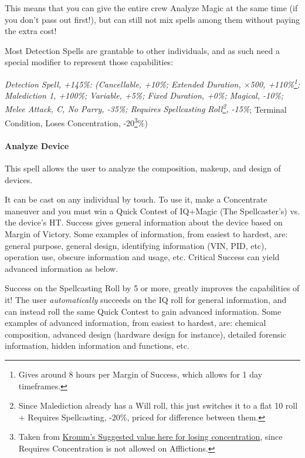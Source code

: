 \begin{multicols}{3}
	This means that you can give the entire crew Analyze Magic at the same time (if you don't pass out first!), but can still not mix spells among them without paying the extra cost!
	
	Most Detection Spells are grantable to other individuals, and as such need a special modifier to represent those capabilities:
	
	\textcolor{OliveGreen}{\textit{Detection Spell, +145\%: (Cancellable, +10\%; Extended Duration, \(\times\)500, +110\%\footnote{Gives around 8 hours per Margin of Success, which allows for 1 day timeframes.}; Malediction 1, +100\%; Variable, +5\%; Fixed Duration, +0\%; Magical, -10\%; Melee Attack, C, No Parry, -35\%; Requires Spellcasting Roll\footnote{Since Malediction already has a Will roll, this just switches it to a flat 10 roll + Requires Spellcasting, -20\%, priced for difference between them.}, -15\%}; Terminal Condition, Loses Concentration, -20\footnote{Taken from \textcolor{Blue}{\href{http://forums.sjgames.com/showpost.php?p=817197&postcount=7}{Kromm's Suggested value here for losing concentration}}, since Requires Concentration is not allowed on Afflictions.}\%)}
	
	\paragraph{Analyze Device}
	
	This spell allows the user to analyze the composition, makeup, and design of devices. 
	
	It can be cast on any individual by touch. To use it, make a Concentrate maneuver and you must win a Quick Contest of IQ+Magic (The Spellcaster's) vs. the device's HT. Success gives general information about the device based on Margin of Victory. Some examples of information, from easiest to hardest, are: general purpose, general design, identifying information (VIN, PID, etc), operation use, obscure information and usage, etc. Critical Success can yield advanced information as below.
	
	Success on the Spellcasting Roll by 5 or more, greatly improves the capabilities of it! The user \textit{automatically} succeeds on the IQ roll for general information, and can instead roll the same Quick Contest to gain advanced information. Some examples of advanced information, from easiest to hardest, are: chemical composition, advanced design (hardware design for instance), detailed forensic information, hidden information and functions, etc.
	

\end{multicols}
